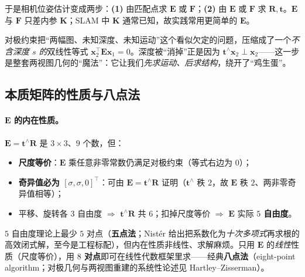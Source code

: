 \noindent 于是相机位姿估计变成两步：\textbf{(1)} 由匹配点求 $\mathbf{E}$ 或 $\mathbf{F}$；\textbf{(2)} 由 $\mathbf{E}$ 或 $\mathbf{F}$ 求 $\mathbf{R},\mathbf{t}$。$\mathbf{E}$ 与 $\mathbf{F}$ 只差内参 $\mathbf{K}$；SLAM 中 $\mathbf{K}$ 通常已知，故实践常用更简单的 $\mathbf{E}$。

\begin{insight}
对极约束把“两幅图、未知深度、未知运动”这个看似欠定的问题，压缩成了一个\emph{不含深度 $s$ 的}双线性等式 $\mathbf{x}_2^\top\mathbf{E}\mathbf{x}_1=0$。深度被“消掉”正是因为 $\mathbf{t}^\wedge\mathbf{x}_2\perp\mathbf{x}_2$——这一步是整套两视图几何的“魔法”：它让我们\emph{先求运动、后求结构}，绕开了“鸡生蛋”。
\end{insight}

\subsection{本质矩阵的性质与八点法}
\label{sec:vo-eight-point}

\paragraph{$\mathbf{E}$ 的内在性质\cite{gaoxiang2019slam14}。}$\mathbf{E}=\mathbf{t}^\wedge\mathbf{R}$ 是 $3\times3$、$9$ 个数，但：
\begin{itemize}
  \item \textbf{尺度等价}：$\mathbf{E}$ 乘任意非零常数仍满足对极约束（等式右边为 $0$）；
  \item \textbf{奇异值必为 $[\sigma,\sigma,0]^\top$}：可由 $\mathbf{E}=\mathbf{t}^\wedge\mathbf{R}$ 证明\cite{gaoxiang2019slam14}（$\mathbf{t}^\wedge$ 秩 $2$，故 $\mathbf{E}$ 秩 $2$、两非零奇异值相等）；
  \item 平移、旋转各 $3$ 自由度 $\Rightarrow$ $\mathbf{t}^\wedge\mathbf{R}$ 共 $6$；扣掉尺度等价 $\Rightarrow$ $\mathbf{E}$ 实际 \textbf{$5$ 自由度}。
\end{itemize}
$5$ 自由度理论上最少 $5$ 对点（\textbf{五点法}；Nistér\cite{nister2004fivepoint} 给出把系数化为\emph{十次多项式}再求根的高效闭式解，至今是工程标配），但内在性质非线性、求解麻烦。只用 $\mathbf{E}$ 的\emph{线性}性质（尺度等价），用 \textbf{$8$ 对点}即可在线性代数框架里求——经典\textbf{八点法}（eight-point algorithm；对极几何与两视图重建的系统性论述见 Hartley--Zisserman\cite{hartley2004multiview}）。

